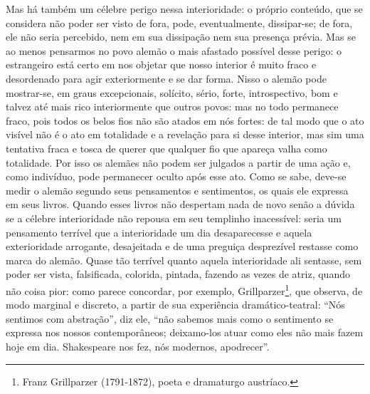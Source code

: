 \begin{enumerate}
\begin{enumerate}
    Mas há também um célebre perigo nessa interioridade: o próprio
    conteúdo, que se considera não poder ser visto de fora, pode,
    eventualmente, dissipar-se; de fora, ele não seria percebido, nem em
    sua dissipação nem sua presença prévia. Mas se ao menos pensarmos no
    povo alemão o mais afastado possível desse perigo: o estrangeiro
    está certo em nos objetar que nosso interior é muito fraco e
    desordenado para agir exteriormente e se dar forma. Nisso o alemão
    pode mostrar-se, em graus excepcionais, solícito, sério, forte,
    introspectivo, bom e talvez até mais rico interiormente que outros
    povos: mas no todo permanece fraco, pois todos os belos fios não são
    atados em nós fortes: de tal modo que o ato visível não é o ato em
    totalidade e a revelação para si desse interior, mas sim uma
    tentativa fraca e tosca de querer que qualquer fio que apareça valha
    como totalidade. Por isso os alemães não podem ser julgados a partir
    de uma ação e, como indivíduo, pode permanecer oculto após esse ato.
    Como se sabe, deve-se medir o alemão segundo seus pensamentos e
    sentimentos, os quais ele expressa em seus livros. Quando esses
    livros não despertam nada de novo senão a dúvida se a célebre
    interioridade não repousa em seu templinho inacessível: seria um
    pensamento terrível que a interioridade um dia desaparecesse e
    aquela exterioridade arrogante, desajeitada e de uma preguiça
    desprezível restasse como marca do alemão. Quase tão terrível quanto
    aquela interioridade ali sentasse, sem poder ser vista, falsificada,
    colorida, pintada, fazendo as vezes de atriz, quando não coisa pior:
    como parece concordar, por exemplo, Grillparzer\footnote{Franz
      Grillparzer (1791-1872), poeta e dramaturgo austríaco.}, que
    observa, de modo marginal e discreto, a partir de sua experiência
    dramático-teatral: ``Nós sentimos com abstração'', diz ele, ``não
    sabemos mais como o sentimento se expressa nos nossos
    contemporâneos; deixamo-los atuar como eles não mais fazem hoje em
    dia. Shakespeare nos fez, nós modernos, apodrecer''.


\end{enumerate}
\end{enumerate}
